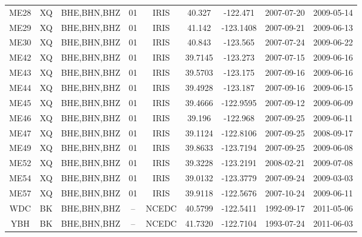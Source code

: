 \documentclass[draft]{agujournal2019}
\begin{document}
\begin{table}
\begin{tabular}{c c c c c c c c c}
ME28 & XQ & BHE,BHN,BHZ & 01 & IRIS & 40.327 & -122.471 & 2007-07-20 & 2009-05-14 \\
ME29 & XQ & BHE,BHN,BHZ & 01 & IRIS & 41.142 & -123.1408 & 2007-09-21 & 2009-06-13 \\
ME30 & XQ & BHE,BHN,BHZ & 01 & IRIS & 40.843 & -123.565 & 2007-07-24 & 2009-06-22 \\
ME42 & XQ & BHE,BHN,BHZ & 01 & IRIS & 39.7145 & -123.273 & 2007-07-15 & 2009-06-16 \\
ME43 & XQ & BHE,BHN,BHZ & 01 & IRIS & 39.5703 & -123.175 & 2007-09-16 & 2009-06-16 \\
ME44 & XQ & BHE,BHN,BHZ & 01 & IRIS & 39.4928 & -123.187 & 2007-09-16 & 2009-06-15 \\
ME45 & XQ & BHE,BHN,BHZ & 01 & IRIS & 39.4666 & -122.9595 & 2007-09-12 & 2009-06-09 \\
ME46 & XQ & BHE,BHN,BHZ & 01 & IRIS & 39.196 & -122.968 & 2007-09-25 & 2009-06-11 \\
ME47 & XQ & BHE,BHN,BHZ & 01 & IRIS & 39.1124 & -122.8106 & 2007-09-25 & 2008-09-17 \\
ME49 & XQ & BHE,BHN,BHZ & 01 & IRIS & 39.8633 & -123.7194 & 2007-09-25 & 2009-06-08 \\
ME52 & XQ & BHE,BHN,BHZ & 01 & IRIS & 39.3228 & -123.2191 & 2008-02-21 & 2009-07-08 \\
ME54 & XQ & BHE,BHN,BHZ & 01 & IRIS & 39.0132 & -123.3779 & 2007-09-24 & 2009-03-03 \\
ME57 & XQ & BHE,BHN,BHZ & 01 & IRIS & 39.9118 & -122.5676 & 2007-10-24 & 2009-06-11 \\
WDC & BK & BHE,BHN,BHZ & -- & NCEDC & 40.5799 & -122.5411 &1992-09-17 & 2011-05-06 \\
YBH &  BK & BHE,BHN,BHZ & -- & NCEDC & 41.7320 & -122.7104 & 1993-07-24 & 2011-06-03 \\
\hline
\end{tabular}
\end{table}
\end{document}
